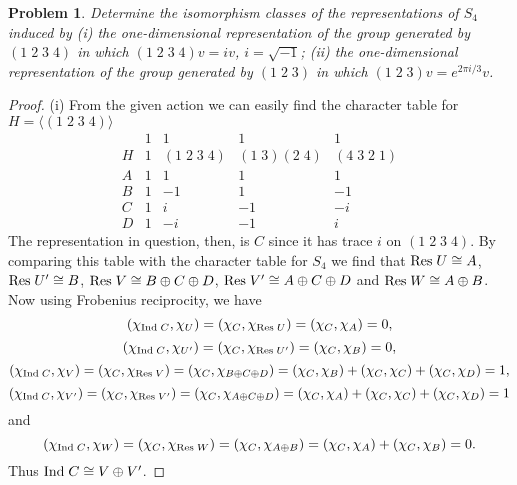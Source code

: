 \documentclass{article}
\newtheorem{problem}{Problem}
\newcommand{\res}{\textup{Res}\;}
\newcommand{\ind}{\textup{Ind}\;}
\begin{document}
\begin{problem}
Determine the isomorphism classes of the representations of $S_4$ induced by (i) the one-dimensional representation of the group generated by $(1 \; 2 \; 3 \; 4)$ in which $(1 \; 2 \; 3 \; 4) v = iv$, $i = \sqrt{-1}$; (ii) the one-dimensional representation of the group generated by $(1 \; 2 \; 3)$ in which $(1 \; 2 \; 3) v = e^{2 \pi i/3} v$.
\end{problem}
\begin{proof}
(i) From the given action we can easily find the character table for $H = \langle (1 \; 2 \; 3 \; 4) \rangle$
\[
\begin{array}{r|rrrr}
& 1 & 1 & 1 & 1\\
H & 1 & (1 \; 2 \; 3 \; 4) & (1 \; 3)(2 \; 4) & (4 \; 3 \; 2 \; 1)\\\hline
A & 1 & 1 & 1 & 1\\
B & 1 & -1 & 1 & -1\\
C & 1 & i & -1 & -i\\
D & 1 & -i & -1 & i
\end{array}
\]
The representation in question, then, is $C$ since it has trace $i$ on $(1 \; 2 \; 3 \; 4)$. By comparing this table with the character table for $S_4$ we find that $\res U \cong A$, $\res U' \cong B$, $\res V \cong B \oplus C \oplus D$, $\res V' \cong A \oplus C \oplus D$ and $\res W \cong A \oplus B$. Now using Frobenius reciprocity, we have
\[
(\chi_{\ind C}, \chi_U) = (\chi_C, \chi_{\res U}) = (\chi_C, \chi_A) = 0,
\]
\[
(\chi_{\ind C}, \chi_{U'}) = (\chi_C, \chi_{\res U'}) = (\chi_C, \chi_B) = 0,
\]
\[
(\chi_{\ind C}, \chi_V) = (\chi_C, \chi_{\res V}) = (\chi_C, \chi_{B \oplus C \oplus D}) = (\chi_C, \chi_B) + (\chi_C, \chi_C) + (\chi_C, \chi_D) = 1,
\]
\[
(\chi_{\ind C}, \chi_{V'}) = (\chi_C, \chi_{\res V'}) = (\chi_C, \chi_{A \oplus C \oplus D}) = (\chi_C, \chi_A) + (\chi_C, \chi_C) + (\chi_C, \chi_D) = 1
\]
and
\[
(\chi_{\ind C}, \chi_W) = (\chi_C, \chi_{\res W}) = (\chi_C, \chi_{A \oplus B}) = (\chi_C, \chi_A) + (\chi_C, \chi_B) = 0.
\]
Thus $\ind C \cong V \oplus V'$.


\end{proof}
\end{document}
